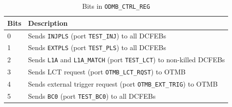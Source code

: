 \documentclass[10pt,a4paper]{article}
\begin{document}
\begin{table}[H]
\centering
\begin{tabular}{|l|l|} \hline
Bits&  Description\\ \hline
0& Sends \texttt{INJPLS} (port \texttt{TEST\_INJ}) to all DCFEBs\\ \hline
1& Sends \texttt{EXTPLS} (port \texttt{TEST\_PLS}) to all DCFEBs\\ \hline
2& Sends \texttt{L1A} and \texttt{L1A\_MATCH} (port \texttt{TEST\_LCT}) to non-killed DCFEBs\\ \hline
3& Sends LCT request (port \texttt{OTMB\_LCT\_RQST}) to OTMB\\ \hline
4& Sends external trigger request (port \texttt{OTMB\_EXT\_TRIG}) to OTMB\\ \hline
5& Sends \texttt{BC0} (port \texttt{TEST\_BC0}) to all DCFEBs\\ \hline	
\end{tabular}
\caption{Bits in \texttt{ODMB\_CTRL\_REG}}
\label{tab:dcfebpulses}
\end{table}
\end{document}
